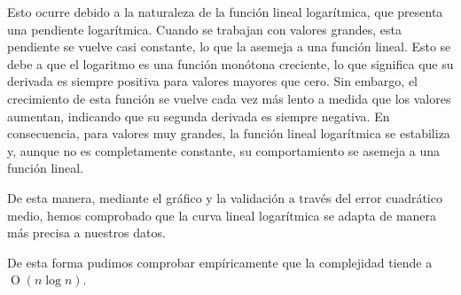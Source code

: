 Esto ocurre debido a la naturaleza de la función lineal logarítmica, que presenta una pendiente logarítmica. Cuando se 
trabajan con valores grandes, esta pendiente se vuelve casi constante, lo que la asemeja a una función lineal. Esto se 
debe a que el logaritmo es una función monótona creciente, lo que significa que su derivada es siempre positiva para valores 
mayores que cero. Sin embargo, el crecimiento de esta función se vuelve cada vez más lento a medida que los valores aumentan, 
indicando que su segunda derivada es siempre negativa. En consecuencia, para valores muy grandes, la función lineal logarítmica 
se estabiliza y, aunque no es completamente constante, su comportamiento se asemeja a una función lineal.

De esta manera, mediante el gráfico y la validación a través del error cuadrático medio, hemos comprobado que la curva lineal logarítmica 
se adapta de manera más precisa a nuestros datos.

De esta forma pudimos comprobar empíricamente que la complejidad tiende a $\operatorname{O}(n\log{n})$.